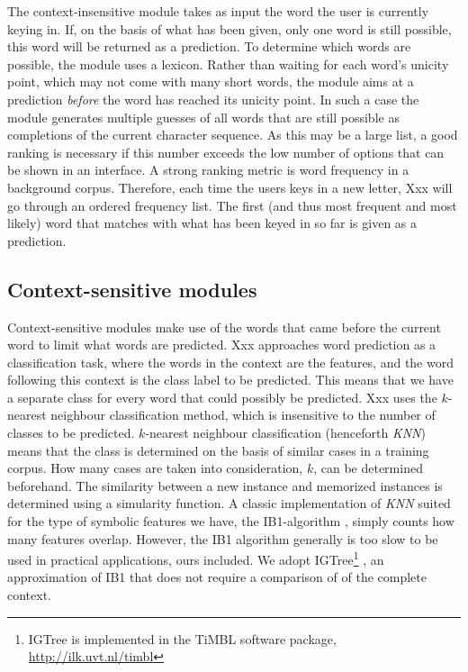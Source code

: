 \documentclass[11pt]{article}
\begin{document}
The context-insensitive module takes as input the word the user is currently keying in. If, on the basis of what has been given, only one word is still possible, this word will be returned as a prediction. To determine which words are possible, the module uses a lexicon. 
Rather than waiting for each word's unicity point, which may not come with many short words, the module aims at a prediction \emph{before} the word has reached its unicity point. In such a case the module generates multiple guesses of all words that are still possible as completions of the current character sequence. As this may be a large list, a good ranking is necessary if this number exceeds the low number of options that can be shown in an interface. A strong ranking metric is word frequency in a background corpus. Therefore, each time the users keys in a new letter, Xxx will go through an ordered frequency list. The first (and thus most frequent and most likely) word that matches with what has been keyed in so far is given as a prediction.

\subsection{Context-sensitive modules} \label{cs}

Context-sensitive modules make use of the words that came before the current word to limit what words are predicted. Xxx approaches word prediction as a classification task, where the words in the context are the features, and the word following this context is the class label to be predicted. This means that we have a separate class for every word that could possibly be predicted. Xxx uses the $k$-nearest neighbour classification method, which is insensitive to the number of classes to be predicted. $k$-nearest neighbour classification (henceforth \emph{KNN}) means that the class is determined on the basis of similar cases in a training corpus. How many cases are taken into consideration, $k$, can be determined beforehand. The similarity between a new instance and memorized instances is determined using a simularity function.  A classic implementation of \emph{KNN} suited for the type of symbolic features we have, the IB1-algorithm \cite{aha+91}, simply counts how many features overlap. However, the IB1 algorithm generally is too slow to be used in practical applications, ours included. We adopt IGTree\footnote{IGTree is implemented in the TiMBL software package, \url{http://ilk.uvt.nl/timbl}} \cite{daelemans+97}, an approximation of IB1 that does not require a comparison of of the complete context.
\end{document}
